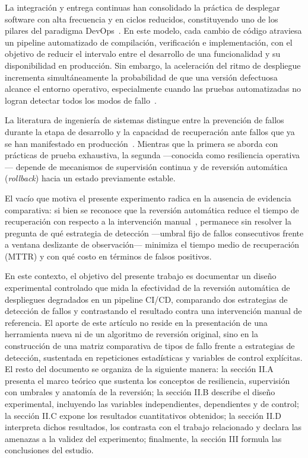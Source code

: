 \documentclass[conference]{IEEEtran}
\begin{document}
La integraci\'on y entrega continuas han consolidado la pr\'actica de desplegar software con alta frecuencia y en ciclos reducidos, constituyendo uno de los pilares del paradigma DevOps~\cite{humble2010continuous, kim2016devops}. En este modelo, cada cambio de c\'odigo atraviesa un pipeline automatizado de compilaci\'on, verificaci\'on e implementaci\'on, con el objetivo de reducir el intervalo entre el desarrollo de una funcionalidad y su disponibilidad en producci\'on. Sin embargo, la aceleraci\'on del ritmo de despliegue incrementa simult\'aneamente la probabilidad de que una versi\'on defectuosa alcance el entorno operativo, especialmente cuando las pruebas automatizadas no logran detectar todos los modos de fallo~\cite{yuan2014simple}.

La literatura de ingenier\'ia de sistemas distingue entre la prevenci\'on de fallos durante la etapa de desarrollo y la capacidad de recuperaci\'on ante fallos que ya se han manifestado en producci\'on~\cite{basiri2016chaos}. Mientras que la primera se aborda con pr\'acticas de prueba exhaustiva, la segunda ---conocida como resiliencia operativa--- depende de mecanismos de supervisi\'on continua y de reversi\'on autom\'atica (\textit{rollback}) hacia un estado previamente estable. 

El vac\'io que motiva el presente experimento radica en la ausencia de evidencia comparativa: si bien se reconoce que la reversi\'on autom\'atica reduce el tiempo de recuperaci\'on con respecto a la intervenci\'on manual~\cite{challa2024selfhealing}, permanece sin resolver la pregunta de qu\'e estrategia de detecci\'on ---umbral fijo de fallos consecutivos frente a ventana deslizante de observaci\'on--- minimiza el tiempo medio de recuperaci\'on (MTTR) y con qu\'e costo en t\'erminos de falsos positivos.

En este contexto, el objetivo del presente trabajo es documentar un dise\~no experimental controlado que mida la efectividad de la reversi\'on autom\'atica de despliegues degradados en un pipeline CI/CD, comparando dos estrategias de detecci\'on de fallos y contrastando el resultado contra una intervenci\'on manual de referencia. El aporte de este art\'iculo no reside en la presentaci\'on de una herramienta nueva ni de un algoritmo de reversi\'on original, sino en la construcci\'on de una matriz comparativa de tipos de fallo frente a estrategias de detecci\'on, sustentada en repeticiones estad\'isticas y variables de control expl\'icitas. El resto del documento se organiza de la siguiente manera: la secci\'on II.A presenta el marco te\'orico que sustenta los conceptos de resiliencia, supervisi\'on con umbrales y anatom\'ia de la reversi\'on; la secci\'on II.B describe el dise\~no experimental, incluyendo las variables independientes, dependientes y de control; la secci\'on II.C expone los resultados cuantitativos obtenidos; la secci\'on II.D interpreta dichos resultados, los contrasta con el trabajo relacionado y declara las amenazas a la validez del experimento; finalmente, la secci\'on III formula las conclusiones del estudio.
\end{document}
